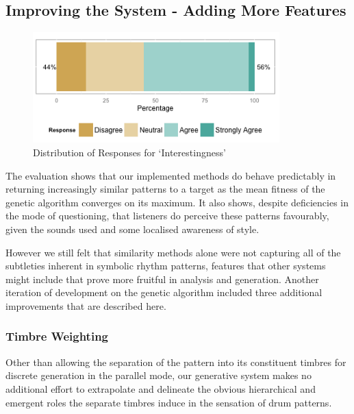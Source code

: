 {{{\subsection{Improving the System - Adding More Features}

\begin{figure}
	\begin{center}
		\includegraphics[width=0.85\textwidth]{ch03_symbolic/figures/interestingness.png}
	\end{center}
	\caption[Distribution of Responses for `Interestingness' in Symbolic Evaluation]{Distribution of Responses for `Interestingness'}
	\label{fig:interesting_distribution}
\end{figure}

The evaluation shows that our implemented methods do behave predictably in returning increasingly similar patterns to a target as the mean fitness of the genetic algorithm converges on its maximum. It also shows, despite deficiencies in the mode of questioning, that listeners do perceive these patterns favourably, given the sounds used and some localised awareness of style.

However we still felt that similarity methods alone were not capturing all of the subtleties inherent in symbolic rhythm patterns, features that other systems might include that prove more fruitful in analysis and generation. Another iteration of development on the genetic algorithm included three additional improvements that are described here.

\subsubsection{Timbre Weighting}

\label{sec:timbre_weighting}

Other than allowing the separation of the pattern into its constituent timbres for discrete generation in the parallel mode, our generative system makes no additional effort to extrapolate and delineate the obvious hierarchical and emergent roles the separate timbres induce in the sensation of drum patterns. 

}}}
